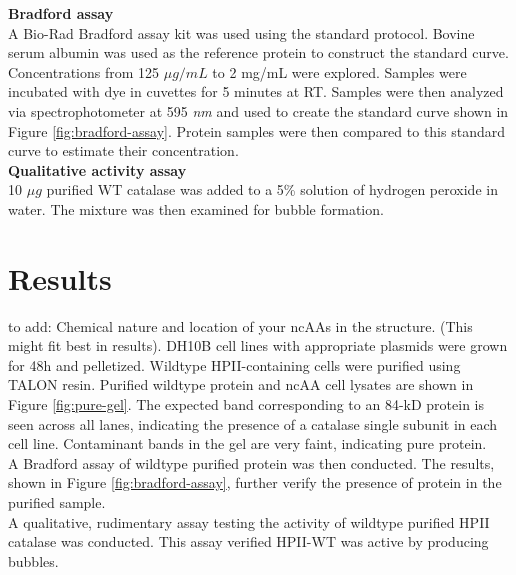 \documentclass[journal=jacsat,manuscript=article]{achemso}
\begin{document}
\textbf{Bradford assay}\\
A Bio-Rad Bradford assay kit was used using the standard protocol. Bovine serum albumin was used as the reference protein to construct the standard curve. Concentrations from 125 $\mu g / mL$ to 2 mg/mL were explored. Samples were incubated with dye in cuvettes for 5 minutes at RT. Samples were then analyzed via spectrophotometer at 595 \textit{nm} and used to create the standard curve shown in Figure \ref{fig:bradford-assay}. Protein samples were then compared to this standard curve to estimate their concentration.\\

\textbf{Qualitative activity assay}\\
10 $\mu g$ purified WT catalase was added to a 5\% solution of hydrogen peroxide in water. The mixture was then examined for bubble formation.\\

\textbf{}

\section{Results}
to add: Chemical nature and location of your ncAAs in the structure. (This might fit best in results).
DH10B cell lines with appropriate plasmids were grown for 48h and pelletized. Wildtype HPII-containing cells were purified using TALON resin. Purified wildtype protein and ncAA cell lysates are shown in Figure \ref{fig:pure-gel}. The expected band corresponding to an 84-kD protein is seen across all lanes, indicating the presence of a catalase single subunit in each cell line. Contaminant bands in the gel are very faint, indicating pure protein.\\

A Bradford assay of wildtype purified protein was then conducted. The results, shown in Figure \ref{fig:bradford-assay}, further verify the presence of protein in the purified sample.\\

A qualitative, rudimentary assay testing the activity of wildtype purified HPII catalase was conducted. This assay verified HPII-WT was active by producing bubbles.\\
\end{document}
